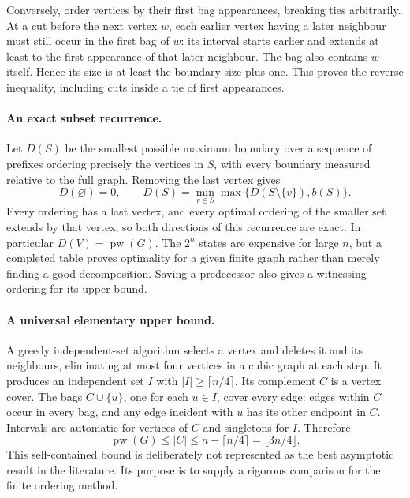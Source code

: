 \documentclass[11pt,a4paper]{article}
\begin{document}
Conversely, order vertices by their first bag appearances, breaking
ties arbitrarily. At a cut before the next vertex $w$, each earlier
vertex having a later neighbour must still occur in the first bag of
$w$: its interval starts earlier and extends at least to the first
appearance of that later neighbour. The bag also contains $w$ itself.
Hence its size is at least the boundary size plus one. This proves
the reverse inequality, including cuts inside a tie of first appearances.

\paragraph{An exact subset recurrence.}
Let $D(S)$ be the smallest possible maximum boundary over a sequence
of prefixes ordering precisely the vertices in $S$, with every boundary
measured relative to the full graph. Removing the last vertex gives
\[
 D(\varnothing)=0,\qquad
 D(S)=\min_{v\in S}\max\{D(S\setminus\{v\}),b(S)\}.
\]
Every ordering has a last vertex, and every optimal ordering of the
smaller set extends by that vertex, so both directions of this
recurrence are exact. In particular $D(V)=\operatorname{pw}(G)$.
The $2^n$ states are expensive for large $n$, but a completed table
proves optimality for a given finite graph rather than merely finding
a good decomposition. Saving a predecessor also gives a witnessing
ordering for its upper bound.

\paragraph{A universal elementary upper bound.}
A greedy independent-set algorithm selects a vertex and deletes it
and its neighbours, eliminating at most four vertices in a cubic
graph at each step. It produces an independent set $I$ with
$|I|\ge\lceil n/4\rceil$. Its complement $C$ is a vertex cover.
The bags $C\cup\{u\}$, one for each $u\in I$, cover every edge:
edges within $C$ occur in every bag, and any edge incident with $u$
has its other endpoint in $C$. Intervals are automatic for vertices
of $C$ and singletons for $I$. Therefore
\[
                   \operatorname{pw}(G)\le |C|
                   \le n-\lceil n/4\rceil=\lfloor3n/4\rfloor.
\]
This self-contained bound is deliberately not represented as the
best asymptotic result in the literature. Its purpose is to supply a
rigorous comparison for the finite ordering method.
\end{document}
